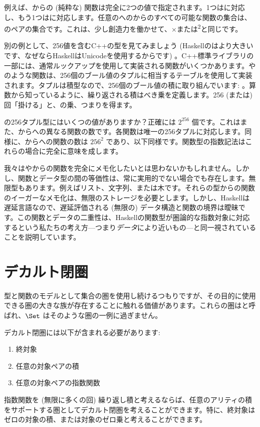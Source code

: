例えば、からの (純粋な) 関数は完全に2つの値で指定されます。1つはに対応し、もう1つはに対応します。任意のへのからのすべての可能な関数の集合は、のペアの集合です。これは、少し創造力を働かせて、×または\textsuperscript{2}と同じです。

別の例として、256値を含むC++の型を見てみましょう (Haskellのはより大きいです、なぜならHaskellはUnicodeを使用するからです) 。C++標準ライブラリの一部には、通常ルックアップを使用して実装される関数がいくつかあります。やのような関数は、256個のブール値のタプルに相当するテーブルを使用して実装されます。タプルは積型なので、256個のブール値の積に取り組んでいます: 。算数から知っているように、繰り返される積はべき乗を定義します。256 (または) 回「掛ける」と、の乗、つまり\textsuperscript{}を得ます。

の256タプル型にはいくつの値がありますか？正確には $2^{256}$ 個です。これはまた、からへの異なる関数の数です。各関数は唯一の256タプルに対応します。同様に、からへの関数の数は $256^{2}$ であり、以下同様です。関数型の指数記法はこれらの場合に完全に意味を成します。

我々はやからの関数を完全にメモ化したいとは思わないかもしれません。しかし、関数とデータ型の間の等価性は、常に実用的でない場合でも存在します。無限型もあります。例えばリスト、文字列、または木です。それらの型からの関数のイーガーなメモ化は、無限のストレージを必要とします。しかし、Haskellは遅延言語なので、遅延評価される (無限の) データ構造と関数の境界は曖昧です。この関数とデータの二重性は、Haskellの関数型が圏論的な指数対象に対応するという私たちの考え方---つまり\emph{データ}により近いもの---と同一視されていることを説明しています。

\section{デカルト閉圏}

型と関数のモデルとして集合の圏を使用し続けるつもりですが、その目的に使用できる圏の大きな族が存在することに触れる価値があります。これらの圏はと呼ばれ、$\Set$ はそのような圏の一例に過ぎません。

デカルト閉圏には以下が含まれる必要があります: 

\begin{enumerate}
  \tightlist
  \item
        終対象
  \item
        任意の対象ペアの積
  \item
        任意の対象ペアの指数関数
\end{enumerate}
指数関数を (無限に多くの回) 繰り返し積と考えるならば、任意のアリティの積をサポートする圏としてデカルト閉圏を考えることができます。特に、終対象はゼロの対象の積、または対象のゼロ乗と考えることができます。

